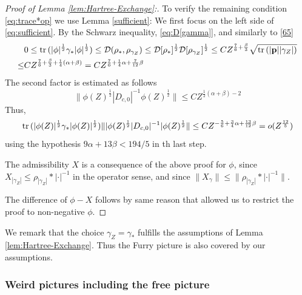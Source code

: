 \documentclass[a4paper]{amsart}
\def\tr{{\rm tr \,}}
\def\bp{{\mathbf p}}
\def\cD{\mathcal{D}}
\begin{document}
\begin{proof}[Proof of Lemma \ref{lem:Hartree-Exchange}:]
  To verify the remaining condition \eqref{eq:trace*op} we use Lemma
  \ref{sufficient}: We first focus on the left side of
  \eqref{eq:sufficient}. By the Schwarz inequality,
  \eqref{eq:D[gamma]}, and similarly to \eqref{65}
  \begin{equation}
    \begin{split}
    \label{66}
    &0\leq \tr(|\phi|^\frac12\gamma_*|\phi|^\frac12) \leq \cD(\rho_*,\rho_{\gamma_Z})
    \leq \cD[\rho_*]^\frac12 \cD[\rho_{\gamma_Z}]^\frac12 \leq
    CZ^{\frac76+\frac\beta3} \sqrt{\tr (|\bp||\gamma_Z|)}\\
    \leq& C Z^{\frac76+\frac\beta3+\frac14(\alpha+\beta)}= CZ^{\frac76+\frac14\alpha+\frac7{12}\beta}
  \end{split}
\end{equation}
  The second factor is estimated as follows
  \begin{equation}
    \label{67}
    \|\phi(Z)^\frac12|D_{c,0}|^{-1}\phi(Z)^\frac12\|\leq C Z^{\frac12(\alpha+\beta)-2}  \end{equation}
  Thus,
  \begin{equation}
    \label{68}
    \tr(|\phi(Z)|^\frac12\gamma_*|\phi(Z)|^\frac12)\||\phi(Z)^\frac12|D_{c,0}|^{-1}|\phi(Z)^\frac12\|\leq CZ^{-\frac56+\frac34\alpha+\frac{13}{12}\beta}=o(Z^\frac{12}5)
  \end{equation}
using the hypothesis $9\alpha+13\beta<194/5$ in th last step.

The admissibility $X$ is a consequence of the above proof for $\phi$,
since $X_{|\gamma_Z|}\leq \rho_{|\gamma_Z|}*|\cdot|^{-1}$ in the
operator sense, and since
$\|X_\gamma\| \leq \|\rho_{|\gamma_Z|}*|\cdot|^{-1}\|$.

The difference of $\phi-X$ follows by same reason that allowed us to
restrict the proof to non-negative $\phi$.
\end{proof}

We remark that the choice $\gamma_Z=\gamma_*$ fulfills the assumptions
of Lemma \ref{lem:Hartree-Exchange}. Thus the Furry picture is also
covered by our assumptions.

\subsubsection{Weird pictures including the free picture} \phantom{x}
\label{ex:exterior}
\end{document}
